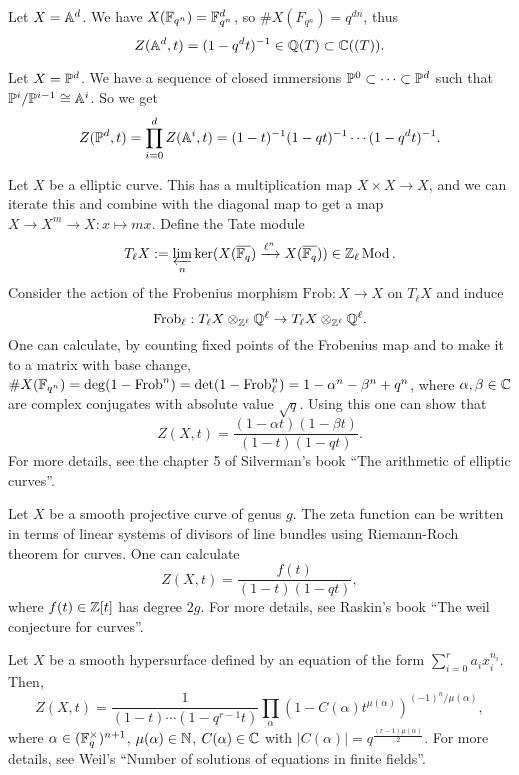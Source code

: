 \documentclass{../../../small}
\begin{document}
\begin{ex*}
Let $X=\A^d$.
We have $X(\F_{q^n})=\F_{q^n}^d$, so $\#X(F_{q^n})=q^{dn}$, thus
\[Z(\A^d,t)=(1-q^dt)^{-1}\in\Q(T)\subset\C((T)).\]
\end{ex*}
\begin{ex*}
Let $X=\P^d$.
We have a sequence of closed immersions $\P^0\subset\cdots\subset\P^d$ such that $\P^i/\P^{i-1}\cong\A^i$.
So we get
\[Z(\P^d,t)=\prod_{i=0}^dZ(\A^i,t)=(1-t)^{-1}(1-qt)^{-1}\cdots(1-q^dt)^{-1}.\]
\end{ex*}
\begin{ex*}
Let $X$ be a elliptic curve.
This has a multiplication map $X\times X\to X$, and we can iterate this and combine with the diagonal map to get a map $X\to X^m\to X:x\mapsto mx$.
Define the Tate module
\[T_\ell X:=\varprojlim_{n}\ker(X(\bar{\F_q})\xrightarrow{\ell^n}X(\bar{\F_q}))\in\Z_\ell\Mod.\]
Consider the action of the Frobenius morphism $\mathrm{Frob}:X\to X$ on $T_\ell X$ and induce
\[\mathrm{Frob}_\ell:T_\ell X\otimes_{\Z^\ell}\Q^\ell\to T_\ell X\otimes_{\Z^\ell}\Q^\ell.\]
One can calculate, by counting fixed points of the Frobenius map and to make it to a matrix with base change, $\#X(\F_{q^n})=\deg(1-\mathrm{Frob}^n)=\det(1-\mathrm{Frob}_\ell^n)=1-\alpha^n-\beta^n+q^n$, where $\alpha,\beta\in\C$ are complex conjugates with absolute value $\sqrt q$.
Using this one can show that
\[Z(X,t)=\frac{(1-\alpha t)(1-\beta t)}{(1-t)(1-qt)}.\]
For more details, see the chapter 5 of Silverman's book ``The arithmetic of elliptic curves''.
\end{ex*}

\begin{ex*}
Let $X$ be a smooth projective curve of genus $g$.
The zeta function can be written in terms of linear systems of divisors of line bundles using Riemann-Roch theorem for curves.
One can calculate
\[Z(X,t)=\frac{f(t)}{(1-t)(1-qt)},\]
where $f(t)\in\Z[t]$ has degree $2g$.
For more details, see Raskin's book ``The weil conjecture for curves''.
\end{ex*}

\begin{ex*}
Let $X$ be a smooth hypersurface defined by an equation of the form $\sum_{i=0}^ra_ix_i^{n_i}$.
Then,
\[Z(X,t)=\frac1{(1-t)\cdots(1-q^{r-1}t)}\prod_\alpha(1-C(\alpha)t^{\mu(\alpha)})^{(-1)^n/\mu(\alpha)},\]
where $\alpha\in(\F_q^\times)^{n+1}$, $\mu(\alpha)\in\N$, $C(\alpha)\in\C$ with $|C(\alpha)|=q^{\frac{(r-1)\mu(\alpha)}2}$.
For more details, see Weil's ``Number of solutions of equations in finite fields''.
\end{ex*}
\end{document}
